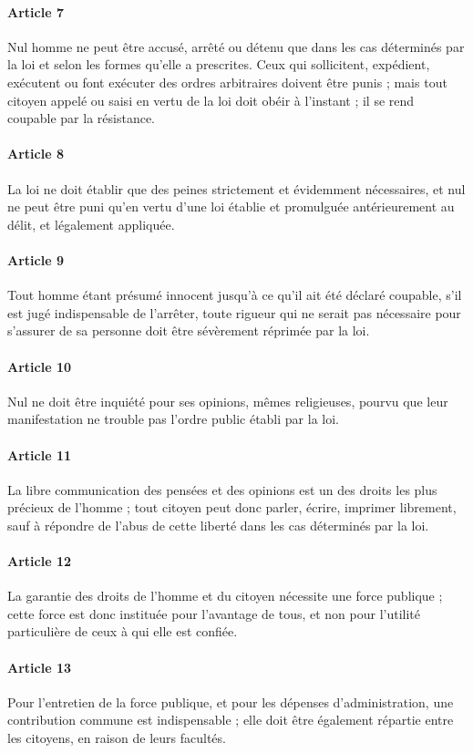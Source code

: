 \documentclass{book}
\begin{document}
\paragraph{Article 7}
Nul homme ne peut être accusé, arrêté ou détenu que dans les cas déterminés par la loi et selon les formes qu'elle a prescrites. Ceux qui sollicitent, expédient, exécutent ou font exécuter des ordres arbitraires doivent être punis ; mais tout citoyen appelé ou saisi en vertu de la loi doit obéir à l'instant ; il se rend coupable par la résistance.
\paragraph{Article 8}
La loi ne doit établir que des peines strictement et évidemment nécessaires, et nul ne peut être puni qu'en vertu d'une loi établie et promulguée antérieurement au délit, et légalement appliquée.
\paragraph{Article 9}
Tout homme étant présumé innocent jusqu'à ce qu'il ait été déclaré coupable, s'il est jugé indispensable de l'arrêter, toute rigueur qui ne serait pas nécessaire pour s'assurer de sa personne doit être sévèrement réprimée par la loi.
\paragraph{Article 10}
Nul ne doit être inquiété pour ses opinions, mêmes religieuses, pourvu que leur manifestation ne trouble pas l'ordre public établi par la loi.
\paragraph{Article 11}
La libre communication des pensées et des opinions est un des droits les plus précieux de l'homme ; tout citoyen peut donc parler, écrire, imprimer librement, sauf à répondre de l'abus de cette liberté dans les cas déterminés par la loi.
\paragraph{Article 12}
La garantie des droits de l'homme et du citoyen nécessite une force publique ; cette force est donc instituée pour l'avantage de tous, et non pour l'utilité particulière de ceux à qui elle est confiée.
\paragraph{Article 13}
Pour l'entretien de la force publique, et pour les dépenses d'administration, une contribution commune est indispensable ; elle doit être également répartie entre les citoyens, en raison de leurs facultés.
\end{document}
